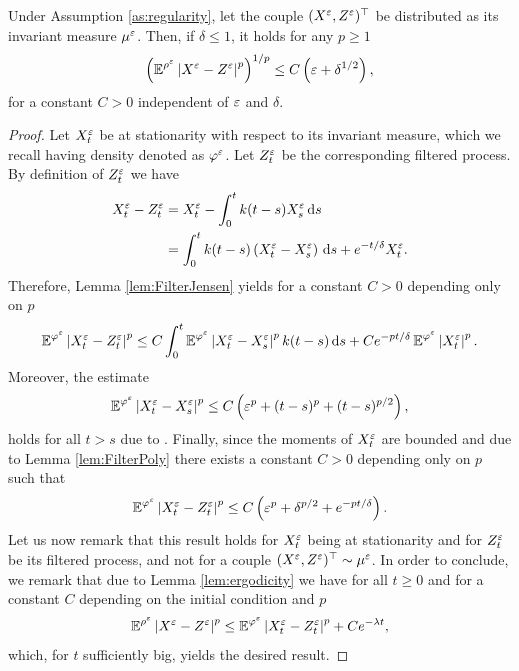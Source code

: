 \documentclass[10pt]{article}
\begin{document}
\begin{appendices}
\begin{lemma}\label{lem:distanceZandX} Under Assumption \ref{as:regularity}, let the couple $(X^\varepsilon, Z^\varepsilon)^\top$ be distributed as its invariant measure $\mu^\varepsilon$. Then, if $\delta \leq 1$, it holds for any $p \geq 1$
	\begin{equation}
		\left(\operatorname{\mathbb{E}}^{\rho^\varepsilon} \left\lvert X^\varepsilon - Z^\varepsilon\right\rvert^p\right)^{1/p} \leq C\left(\varepsilon + \delta^{1/2}\right),
	\end{equation}
	for a constant $C > 0$ independent of $\varepsilon$ and $\delta$.
\end{lemma}
\begin{proof} Let $X_t^\varepsilon$ be at stationarity with respect to its invariant measure, which we recall having density denoted as $\varphi^\varepsilon$. Let $Z_t^\varepsilon$ be the corresponding filtered process. By definition of $Z^\varepsilon_t$ we have
	\begin{equation}
	\begin{aligned}
		X_t^\varepsilon - Z_t^\varepsilon &= X_t^\varepsilon - \int_0^t k(t-s) X_s^\varepsilon \,\mathrm{d} s\\
		&= \int_0^t k(t - s) \left(X_t^\varepsilon - X_s^\varepsilon\right) \,\mathrm{d} s + e^{-t/\delta} X^\varepsilon_t.
	\end{aligned}
	\end{equation}
	Therefore, Lemma \ref{lem:FilterJensen} yields for a constant $C > 0$ depending only on $p$
	\begin{equation}
		\operatorname{\mathbb{E}}^{\varphi^\varepsilon}\left\lvert X_t^\varepsilon - Z_t^\varepsilon\right\rvert^p \leq C\int_0^t \operatorname{\mathbb{E}}^{\varphi^\varepsilon} \left\lvert X_t^\varepsilon - X_s^\varepsilon\right\rvert^p k(t-s) \,\mathrm{d} s + Ce^{-pt/\delta} \operatorname{\mathbb{E}}^{\varphi^\varepsilon} \left\lvert X^\varepsilon_t\right\rvert^p.
	\end{equation}
	Moreover, the estimate
	\begin{equation}
		\operatorname{\mathbb{E}}^{\varphi^\varepsilon}\left\lvert X_t^\varepsilon - X_s^\varepsilon\right\rvert^p \leq C\left(\varepsilon^p + (t-s)^p + (t-s)^{p/2}\right),
	\end{equation}
	holds for all $t > s$ due to \cite[Lemma 6.1]{PaS07}. Finally, since the moments of $X_t^\varepsilon$ are bounded \cite[Corollary 5.4]{PaS07} and due to Lemma \ref{lem:FilterPoly} there exists a constant $C > 0$ depending only on $p$ such that
	\begin{equation}
		\operatorname{\mathbb{E}}^{\varphi^\varepsilon}\left\lvert X_t^\varepsilon - Z_t^\varepsilon\right\rvert^p \leq C\left(\varepsilon^p + \delta^{p/2} + e^{-pt/\delta}\right).
	\end{equation}
	Let us now remark that this result holds for $X_t^\varepsilon$ being at stationarity and for $Z_t^\varepsilon$ be its filtered process, and not for a couple $(X^\varepsilon, Z^\varepsilon)^\top \sim \mu^\varepsilon$. In order to conclude, we remark that due to Lemma \ref{lem:ergodicity} we have for all $t \geq 0$ and for a constant $C$ depending on the initial condition and $p$  
	\begin{equation}
	\operatorname{\mathbb{E}}^{\rho^\varepsilon} \left\lvert X^\varepsilon - Z^\varepsilon\right\rvert^p \leq \operatorname{\mathbb{E}}^{\varphi^\varepsilon}\left\lvert X_t^\varepsilon - Z_t^\varepsilon\right\rvert^p + Ce^{-\lambda t},
	\end{equation}
	which, for $t$ sufficiently big, yields the desired result.
\end{proof}


\end{appendices}
\end{document}
